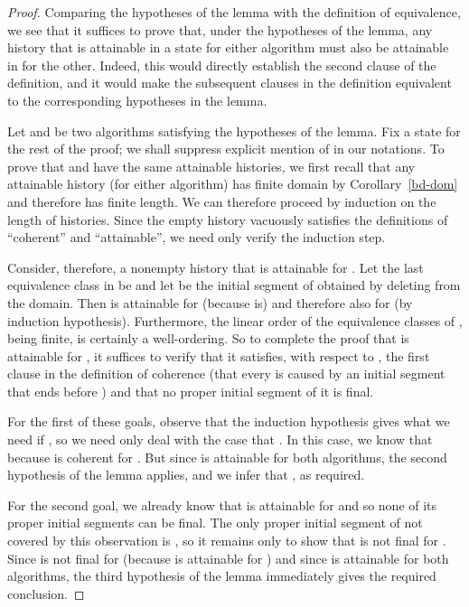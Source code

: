 \documentclass{LMCS}
\theoremstyle{definition}
\begin{document}
\begin{proof}
Comparing the hypotheses of the lemma with the definition of
equivalence, we see that it suffices to prove that, under the
hypotheses of the lemma, any history that is attainable in a state 
for either algorithm must also be attainable in  for the other.
Indeed, this would directly establish the second clause of the
definition, and it would make the subsequent clauses in the definition
equivalent to the corresponding hypotheses in the lemma.

Let  and  be two algorithms satisfying the hypotheses of the
lemma.  Fix a state  for the rest of the proof; we shall suppress
explicit mention of  in our notations.  To prove that  and
 have the same attainable histories, we first recall that any
attainable history (for either algorithm) has finite domain by
Corollary~\ref{bd-dom} and therefore has finite length.  We can
therefore proceed by induction on the length of histories.  Since the
empty history vacuously satisfies the definitions of ``coherent'' and
``attainable'', we need only verify the induction step.

Consider, therefore, a nonempty history  that is attainable for
.  Let the last equivalence class in  be  and let
 be the initial segment of  obtained by deleting  from
the domain.  Then  is attainable for  (because  is)
and therefore also for  (by induction hypothesis).  Furthermore,
the linear order of the equivalence classes of , being finite,
is certainly a well-ordering.  So to complete the proof that  is
attainable for , it suffices to verify that it satisfies, with
respect to , the first clause in the definition of coherence
(that every  is caused by an initial segment that ends
before ) and that no proper initial segment of it is final.

For the first of these goals, observe that the induction hypothesis
gives what we need if , so we need only deal with the
case that .  In this case, we know that
 because  is coherent for .  But
since  is attainable for both algorithms, the second hypothesis
of the lemma applies, and we infer that , as
required.

For the second goal, we already know that  is attainable for
 and so none of its proper initial segments can be final.  The
only proper initial segment of  not covered by this observation
is , so it remains only to show that  is not final for
.  Since  is not final for  (because  is
attainable for ) and since  is attainable for both
algorithms, the third hypothesis of the lemma immediately gives the
required conclusion.
\end{proof}
\end{document}
